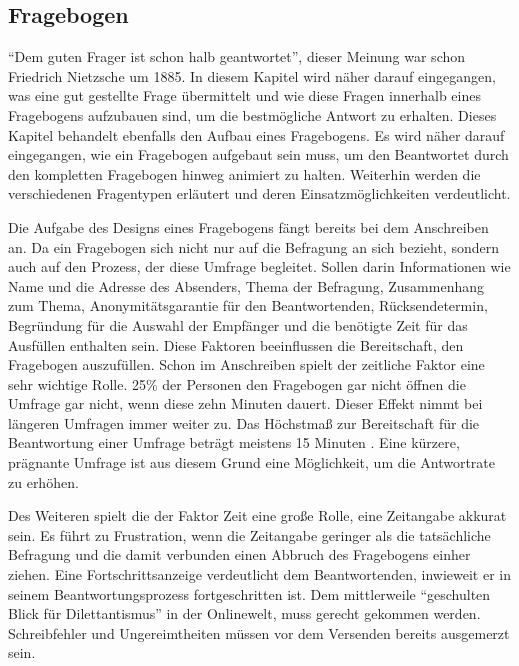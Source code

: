\subsection{Fragebogen}
\label{acqusition}
\enquote{Dem guten Frager ist schon halb geantwortet}, dieser Meinung war schon Friedrich Nietzsche um 1885. 
In diesem Kapitel wird näher darauf eingegangen, was eine gut gestellte Frage übermittelt und wie diese Fragen innerhalb eines Fragebogens aufzubauen sind, um die bestmögliche Antwort zu erhalten\autocite{Nietzsche}.
Dieses Kapitel behandelt ebenfalls den Aufbau eines Fragebogens. 
Es wird näher darauf eingegangen, wie ein Fragebogen aufgebaut sein muss, um den Beantwortet durch den kompletten Fragebogen hinweg animiert zu halten. 
Weiterhin werden die verschiedenen Fragentypen erläutert und deren Einsatzmöglichkeiten verdeutlicht. 

Die Aufgabe des Designs eines Fragebogens fängt bereits bei dem Anschreiben an.
Da ein Fragebogen sich nicht nur auf die Befragung an sich bezieht, sondern auch auf den Prozess, der diese Umfrage begleitet.
Sollen darin Informationen wie Name und die Adresse des Absenders, Thema der Befragung, Zusammenhang zum Thema, Anonymitätsgarantie für den Beantwortenden, Rücksendetermin, Begründung für die Auswahl der Empfänger und die benötigte Zeit für das Ausfüllen enthalten sein\autocite[S.29]{2003Fragebogen}. %
Diese Faktoren beeinflussen die Bereitschaft, den Fragebogen auszufüllen. 
Schon im Anschreiben spielt der zeitliche Faktor eine sehr wichtige Rolle. 
25\% der Personen den Fragebogen gar nicht öffnen die Umfrage gar nicht, wenn diese zehn Minuten dauert.
Dieser Effekt nimmt bei längeren Umfragen immer weiter zu\autocite[S.353]{NFP}.
Das Höchstmaß zur Bereitschaft für die Beantwortung einer Umfrage beträgt meistens 15 Minuten \autocite[S.37]{2009Fragebogen}. %
Eine kürzere, prägnante Umfrage ist aus diesem Grund eine Möglichkeit, um die Antwortrate zu erhöhen.

Des Weiteren spielt die der Faktor Zeit eine große Rolle, eine Zeitangabe akkurat sein.
Es führt zu Frustration, wenn die Zeitangabe geringer als die tatsächliche Befragung und die damit verbunden einen Abbruch des Fragebogens einher ziehen. 
Eine Fortschrittsanzeige verdeutlicht dem Beantwortenden, inwieweit er in seinem Beantwortungsprozess fortgeschritten ist. 
Dem mittlerweile \enquote{geschulten Blick für Dilettantismus} in der Onlinewelt, muss gerecht gekommen werden.
Schreibfehler und Ungereimtheiten müssen vor dem Versenden bereits ausgemerzt sein\autocite[S.37]{2009Fragebogen}. %

